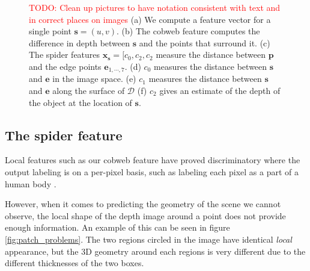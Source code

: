 \documentclass[10pt,twocolumn,letterpaper]{article}
\newcommand{\rgbdimage}{\mathcal{D}}
\newcommand{\pixelidx}{\mathbf{s}}
\newcommand{\edgeimidx}{\mathbf{e}}
\newcommand{\point}{\mathbf{p}}
\newcommand{\todo}[1]{\textcolor{red}{TODO: #1}}
\newcommand{\note}[1]{\textcolor{blue}{NOTE: #1}}
\begin{document}
\begin{figure}[tb]
        \hfill
    \caption{
    \todo{Clean up pictures to have notation consistent with text and in correct places on images}
    (a) We compute a feature vector for a single point $\pixelidx = (u, v)$.
    (b) The cobweb feature computes the difference in depth between $\pixelidx$ and the points that surround it.
    (c) The spider features $\mathbf{x_s} = [c_0, c_2, c_2$ measure the distance between $\point$ and the edge points $\edgeimidx_{1, \cdots, 7}$.
    (d) $c_0$ measures the distance between $\pixelidx$ and $\edgeimidx$ in the image space.
    (e) $c_1$ measures the distance between $\pixelidx$ and $\edgeimidx$ along the surface of $\rgbdimage$
    (f) $c_2$ gives an estimate of the depth of the object at the location of $\pixelidx$.
    }%
    \label{fig:features}
\end{figure}


\subsection{The spider feature}

Local features such as our cobweb feature have proved discriminatory where the output labeling is on a per-pixel basis, such as labeling each pixel as a part of a human body \cite{shotton-cvpr-2011}.

However, when it comes to predicting the geometry of the scene we cannot observe, the local shape of the depth image around a point does not provide enough information. 
An example of this can be seen in figure \ref{fig:patch_problems}.
The two regions circled in the image have identical \emph{local} appearance, but the 3D geometry around each regions is very different due to the different thicknesses of the two boxes.
\end{document}
